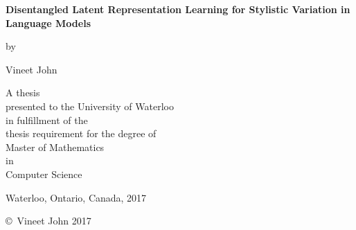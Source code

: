 \pagestyle{empty}

\begin{titlepage}
	\begin{center}
		\vspace*{1.0cm}

		\Huge
		{\bf Disentangled Latent Representation Learning for Stylistic Variation in Language Models}

		\vspace*{1.0cm}

		\normalsize
		by \\

		\vspace*{1.0cm}

		\Large
		Vineet John \\

		\vspace*{3.0cm}

		\normalsize
		A thesis \\
		presented to the University of Waterloo \\
		in fulfillment of the \\
		thesis requirement for the degree of \\
		Master of Mathematics \\
		in \\
		Computer Science \\

		\vspace*{2.0cm}

		Waterloo, Ontario, Canada, 2017 \\

		\vspace*{1.0cm}

		\copyright\ Vineet John 2017 \\
	\end{center}
\end{titlepage}

\pagestyle{plain}
\setcounter{page}{2}

\cleardoublepage %

